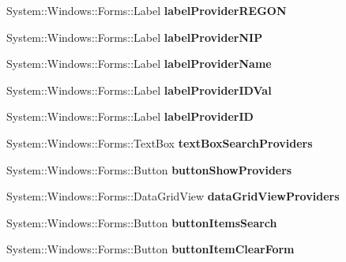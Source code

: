 \begin{DoxyCompactItemize}
System\+::\+Windows\+::\+Forms\+::\+Label {\bfseries label\+Provider\+R\+E\+G\+ON}
\item 
\hypertarget{class_magazyn_1_1_magazin_aba52a73fe50acf04ff8afc3d0cc2d5e7}{}\label{class_magazyn_1_1_magazin_aba52a73fe50acf04ff8afc3d0cc2d5e7} 
System\+::\+Windows\+::\+Forms\+::\+Label {\bfseries label\+Provider\+N\+IP}
\item 
\hypertarget{class_magazyn_1_1_magazin_adb5cc976be9f8528e40a237f2b458ce9}{}\label{class_magazyn_1_1_magazin_adb5cc976be9f8528e40a237f2b458ce9} 
System\+::\+Windows\+::\+Forms\+::\+Label {\bfseries label\+Provider\+Name}
\item 
\hypertarget{class_magazyn_1_1_magazin_aad23df3890c9ab6a79b464d588b2c8b4}{}\label{class_magazyn_1_1_magazin_aad23df3890c9ab6a79b464d588b2c8b4} 
System\+::\+Windows\+::\+Forms\+::\+Label {\bfseries label\+Provider\+I\+D\+Val}
\item 
\hypertarget{class_magazyn_1_1_magazin_a14e30dd6cdb2dc0fc60ce6368452651a}{}\label{class_magazyn_1_1_magazin_a14e30dd6cdb2dc0fc60ce6368452651a} 
System\+::\+Windows\+::\+Forms\+::\+Label {\bfseries label\+Provider\+ID}
\item 
\hypertarget{class_magazyn_1_1_magazin_a31575e651abd873fc4d555ee9f78ae72}{}\label{class_magazyn_1_1_magazin_a31575e651abd873fc4d555ee9f78ae72} 
System\+::\+Windows\+::\+Forms\+::\+Text\+Box {\bfseries text\+Box\+Search\+Providers}
\item 
\hypertarget{class_magazyn_1_1_magazin_a025d0b5b953b0880bbc31170df49dc5c}{}\label{class_magazyn_1_1_magazin_a025d0b5b953b0880bbc31170df49dc5c} 
System\+::\+Windows\+::\+Forms\+::\+Button {\bfseries button\+Show\+Providers}
\item 
\hypertarget{class_magazyn_1_1_magazin_a60a6f32fed3cc8795df362af5029fdcd}{}\label{class_magazyn_1_1_magazin_a60a6f32fed3cc8795df362af5029fdcd} 
System\+::\+Windows\+::\+Forms\+::\+Data\+Grid\+View {\bfseries data\+Grid\+View\+Providers}
\item 
\hypertarget{class_magazyn_1_1_magazin_aff3235c2e47d5d598ad88103536e20bc}{}\label{class_magazyn_1_1_magazin_aff3235c2e47d5d598ad88103536e20bc} 
System\+::\+Windows\+::\+Forms\+::\+Button {\bfseries button\+Items\+Search}
\item 
\hypertarget{class_magazyn_1_1_magazin_a08de2422e04c2a5f302b8ea5210be8e9}{}\label{class_magazyn_1_1_magazin_a08de2422e04c2a5f302b8ea5210be8e9} 
System\+::\+Windows\+::\+Forms\+::\+Button {\bfseries button\+Item\+Clear\+Form}
\item 
\hypertarget{class_magazyn_1_1_magazin_a1fecd18f8726bb59ccf075bed81a49fa}{}\label{class_magazyn_1_1_magazin_a1fecd18f8726bb59ccf075bed81a49fa} 

\end{DoxyCompactItemize}
